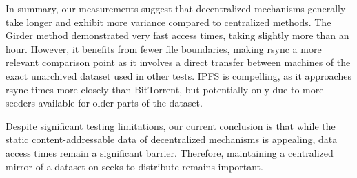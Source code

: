 \documentclass[10pt,twocolumn,letterpaper]{article}
\begin{document}
In summary, our measurements suggest that decentralized mechanisms generally take longer and exhibit more
  variance compared to centralized methods.
The Girder method demonstrated very fast access times, taking slightly more than an hour.
However, it benefits from fewer file boundaries, making rsync a more relevant comparison point as it
  involves a direct transfer between machines of the exact unarchived dataset used in other tests.
IPFS is compelling, as it approaches rsync times more closely than BitTorrent, but potentially only due to
  more seeders available for older parts of the dataset.

Despite significant testing limitations, our current conclusion is that while the static content-addressable
  data of decentralized mechanisms is appealing, data access times remain a significant barrier.
Therefore, maintaining a centralized mirror of a dataset on seeks to distribute remains important.





\end{document}
